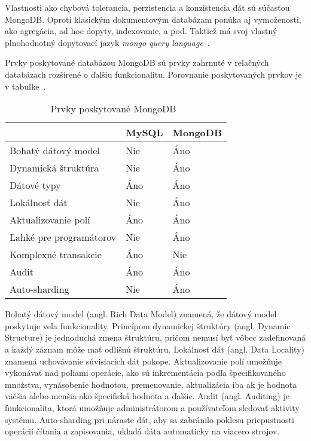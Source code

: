 Vlastnosti ako chybová tolerancia, perzistencia a konzistencia dát sú súčasťou MongoDB. Oproti klasickým dokumentovým databázam ponúka aj vymoženosti, ako agregácia, ad hoc dopyty, indexovanie, a pod. Taktiež má svoj vlastný plnohodnotný dopytovací jazyk \textit{mongo query language}~\cite{NoSQLDBvsRealtionDB}.

Prvky poskytované databázou MongoDB sú prvky zahrnuté v relačných databázach rozšírené o ďalšiu funkcionalitu. Porovnanie poskytovaných prvkov je v tabuľke~. 

\begin{table}[H]
	\centering
	\caption{Prvky poskytované MongoDB~\cite{MongoDBvsMySQLCompared}}
	\label{table:features_of_mongodb}
	\begin{tabular}{|l|l|l|}
		\hline
		& \textbf{MySQL} & \textbf{MongoDB} \\ \hline
		Bohatý dátový model & Nie & Áno \\ \hline
		Dynamická štruktúra & Nie & Áno \\ \hline
		Dátové typy & Áno & Áno \\ \hline
		Lokálnosť dát & Nie & Áno \\ \hline
		Aktualizovanie polí & Áno & Áno \\ \hline
		Ľahké pre programátorov & Nie & Áno \\ \hline
		Komplexné transakcie & Áno & Nie \\ \hline
		Audit & Áno & Áno \\ \hline
		Auto-sharding & Nie & Áno \\ \hline
	\end{tabular}
\end{table}

Bohatý dátový model (angl. Rich Data Model) znamená, že dátový model poskytuje veľa funkcionality. Princípom dynamickej štruktúry (angl. Dynamic Structure) je jednoduchá zmena štruktúru, pričom nemusí byť vôbec zadefinovaná a každý záznam môže mať odlišnú štruktúru. Lokálnosť dát (angl. Data Locality) znamená uchovávanie súvisiacich dát pokope. Aktualizovanie polí umožňuje vykonávať nad poliami operácie, ako sú inkrementácia podľa špecifikovaného množstva, vynásobenie hodnotou, premenovanie, aktualizácia iba ak je hodnota väčšia alebo menšia ako špecifická hodnota a ďalšie. Audit (angl. Auditing) je funkcionalita, ktorá umožňuje administrátorom a používateľom sledovať aktivity systému.
Auto-sharding pri náraste dát, aby sa zabránilo poklesu priepustnosti operácií čítania a zapisovania, ukladá dáta automaticky na viacero strojov.

